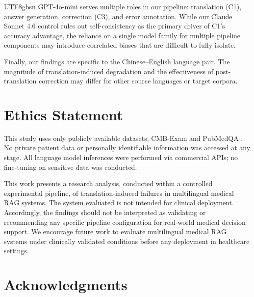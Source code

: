 \documentclass[11pt]{article}
\begin{document}
\begin{CJK}{UTF8}{gbsn}
GPT-4o-mini serves multiple roles in our pipeline: translation (C1), answer generation, correction (C3), and error annotation. While our Claude Sonnet 4.6 control rules out self-consistency as the primary driver of C1's accuracy advantage, the reliance on a single model family for multiple pipeline components may introduce correlated biases that are difficult to fully isolate.

Finally, our findings are specific to the Chinese–English language pair. The magnitude of translation-induced degradation and the effectiveness of post-translation correction may differ for other source languages or target corpora.



\section*{Ethics Statement}
This study uses only publicly available datasets: CMB-Exam \cite{wang-etal-2024-cmb} and PubMedQA \cite{jin-etal-2019-pubmedqa}. No private patient data or personally identifiable information was accessed at any stage. All language model inferences were performed via commercial APIs; no fine-tuning on sensitive data was conducted.

This work presents a research analysis, conducted within a controlled experimental pipeline, of translation-induced failures in multilingual medical RAG systems. The system evaluated is not intended for clinical deployment. Accordingly, the findings should not be interpreted as validating or recommending any specific pipeline configuration for real-world medical decision support. We encourage future work to evaluate multilingual medical RAG systems under clinically validated conditions before any deployment in healthcare settings.

\section*{Acknowledgments}


%





\end{CJK}
\end{document}
